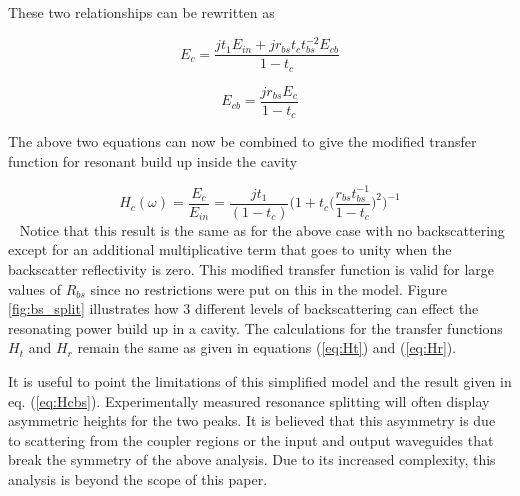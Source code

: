 \documentclass[10pt]{article}
\begin{document}
These two relationships can be rewritten as  

\begin{equation} E_c = \frac{j t_1 E_{in} + j r_{bs} t_c t_{bs}^{-2} E_{cb} }{1-t_c} \end{equation} 

\begin{equation} E_{cb} = \frac{j r_{bs} E_{c} }{1-t_c} \end{equation} 

The above two equations can now be combined to give the modified transfer function for resonant build up inside the cavity 

\begin{equation} 
\boxed{ H_c (\omega) =  \frac{E_c}{E_{in}} = \frac{j t_1 }{(1-t_c)}  \bigg( 1+t_c \Big(\frac{r_{bs} t_{bs}^{-1}}{1-t_c}\Big)^2  \bigg)^{-1}      }
\label{eq:Hcbs} 
\end{equation} 
~
\newline
Notice that this result is the same as for the above case with no backscattering except for an additional multiplicative term that goes to unity when the backscatter reflectivity is zero.   This modified transfer function is valid for  large values of $R_{bs}$ since no restrictions were put on this in the model.   Figure \ref{fig:bs_split} illustrates how 3 different levels of backscattering can effect the resonating  power build up in a cavity.      The calculations for the transfer functions  $H_t$ and  $H_r$  remain the same as given in equations (\ref{eq:Ht}) and (\ref{eq:Hr}). 


It is useful to point the limitations of this simplified model and the result given in eq. (\ref{eq:Hcbs}).  Experimentally measured resonance splitting will often display asymmetric heights for the two peaks.  It is believed that this asymmetry is due to scattering from the coupler regions or the input and output waveguides that break the symmetry of the above analysis. Due to its increased complexity, this analysis is beyond the scope of this paper.



\end{document}
